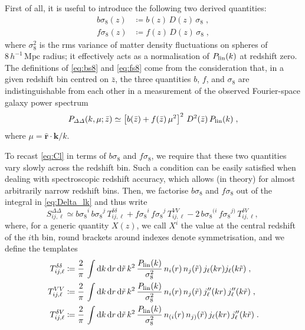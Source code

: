 \documentclass[astrosymb,twocolumn]{aastex631}
\newcommand{\de}{\mathrm{d}}
\newcommand{\bs}{\ensuremath{b\sigma_8}}
\renewcommand{\fs}{\ensuremath{f\!\sigma_8}}
\begin{document}
First of all, it is useful to introduce the following two derived quantities:
\begin{align}
    \bs(z)&\coloneqq b(z)\,D(z)\,\sigma_8\;,\label{eq:bs8}\\
    \fs(z)&\coloneqq f(z)\,D(z)\,\sigma_8\;,\label{eq:fs8}
\end{align}
where \(\sigma_8^2\) is the rms variance of matter density fluctuations on spheres of \(8\,h^{-1}\,\mathrm{Mpc}\) radius; it effectively acts as a normalisation of \(P_{\rm lin}(k)\) at redshift zero. The definitions of \autoref{eq:bs8} and \autoref{eq:fs8} come from the consideration that, in a given redshift bin centred on \(\bar z\), the three quantities \(b\), \(f\), and \(\sigma_8\) are indistinguishable from each other in a measurement of the observed Fourier-space galaxy power spectrum
\begin{equation}
    P_{\varDelta\varDelta}(k,\mu;\bar z)\simeq\left[b(\bar z)+f(\bar z)\,\mu^2\right]^2\,D^2(\bar z)\,P_{\rm lin}(k)\;,
\end{equation}
where \(\mu=\hat{\bm r}\cdot\bm k/k\).

To recast \autoref{eq:Cl} in terms of \(\bs\) and \(\fs\), we require that these two quantities vary slowly across the redshift bin. Such a condition can be easily satisfied when dealing with spectroscopic redshift accuracy, which allows (in theory) for almost arbitrarily narrow redshift bins. Then, we factorise \(\bs\) and \(\fs\) out of the integral in \autoref{eq:Delta_lk} and thus write
\begin{equation}
    S^{\varDelta\varDelta}_{ij,\ell}\simeq\bs^i\,\bs^j\,T^{\delta\delta}_{ij,\ell}+\fs^i\,\fs^j\,T^{VV}_{ij,\ell}-2\,\bs^{(i}\,\fs^{j)}\,T^{\delta V}_{ij,\ell},\,\label{eq:Cl_ours}
\end{equation}
where, for a generic quantity \(X(z)\), we call \(X^i\) the value at the central redshift of the \(i\)th bin, round brackets around indexes denote symmetrisation, and we define the templates
\begin{align}
    T^{\delta\delta}_{ij,\ell}&\coloneqq\frac2\pi\,\int\de k\,\de r\,\de\tilde r\,k^2\,\frac{P_{\rm lin}(k)}{\sigma_8^2}\,n_i( r)\,n_j(\tilde r)\,j_\ell(k r)j_\ell(k\tilde r)\;,\label{eq:factorised_delta-delta}\\
    T^{VV}_{ij,\ell}&\coloneqq\frac2\pi\,\int\de k\,\de r\,\de\tilde r\,k^2\,\frac{P_{\rm lin}(k)}{\sigma_8^2}\,n_i( r)\,n_j(\tilde r)\,j^{\prime\prime}_\ell(k r)\,j^{\prime\prime}_\ell(k\tilde r)\;,\label{eq:factorised_v-v}\\
    T^{\delta V}_{ij,\ell}&\coloneqq\frac2\pi\,\int\de k\,\de r\,\de\tilde r\,k^2\,\frac{P_{\rm lin}(k)}{\sigma_8^2}\,n_{(i}( r)\,n_{j)}(\tilde r)\,j_\ell(k r)\,j^{\prime\prime}_\ell(k\tilde r)\;.
    \label{eq:factorised_delta-v}
\end{align}
\end{document}
